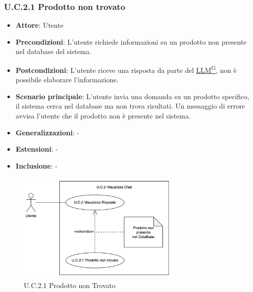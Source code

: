 \subsubsection{U.C.2.1 Prodotto non trovato}
\begin{itemize}
    \item \textbf{Attore}: Utente
    \item \textbf{Precondizioni}: L'utente richiede informazioni su un prodotto non presente nel database del sistema.
    \item \textbf{Postcondizioni}: L'utente riceve una risposta da parte del \href{https://code7crusaders.github.io/docs/RTB/documentazione_interna/glossario.html#llm-large-language-model}{LLM\textsuperscript{G}}, non è possibile elaborare l'informazione.
    \item \textbf{Scenario principale}: L'utente invia una domanda su un prodotto specifico, il sistema cerca nel database ma non trova risultati. Un messaggio di errore avvisa l'utente che il prodotto non è presente nel sistema.
    \item \textbf{Generalizzazioni}: -
    \item \textbf{Estensioni}: -
    \item \textbf{Inclusione}: -
\end{itemize}
\begin{figure}[H]
    \centering
    \includegraphics[width=0.7\textwidth]{img/UC2.1.png}
    \caption{U.C.2.1 Prodotto non Trovato}
\end{figure}
\newpage
 
